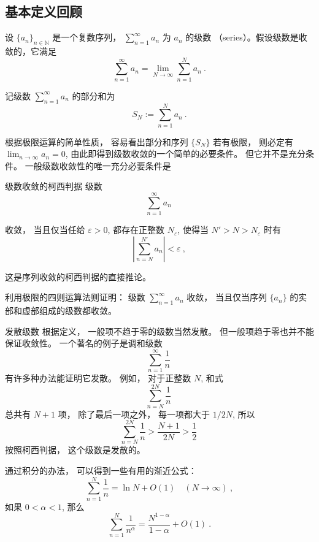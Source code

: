 

\subsection{基本定义回顾}


设 $\{a_n\}_{n\in\mathbb{N}}$ 是一个复数序列， $\sum_{n=1}^\infty a_n$ 为 $a_n$ 的级数 （series）。假设级数是收敛的，它满足
$$
\sum_{n=1}^\infty a_n = \lim_{N \to \infty} \sum_{n=1}^N a_n~.
$$

记级数 $\sum_{n=1}^\infty a_n$ 的部分和为
\[
S_N := \sum_{n=1}^N a_n~.
\]

根据极限运算的简单性质， 容易看出部分和序列 $\{S_N\}$ 若有极限， 则必定有 $\lim_{n\to\infty}a_n=0$, 由此即得到级数收敛的一个简单的必要条件。 但它并不是充分条件。 一般级数收敛性的唯一充分必要条件是
\begin{theorem}{级数收敛的柯西判据}
级数
\begin{equation}
\sum_{n=1}^\infty a_n~
\end{equation}



收敛， 当且仅当任给 $\varepsilon>0$, 都存在正整数 $N_\varepsilon$, 使得当 $N'>N>N_\varepsilon$ 时有
$$
\left|\sum_{n=N}^{N'} a_n\right|<\varepsilon~,
$$
\end{theorem}
这是序列收敛的柯西判据的直接推论。

\begin{exercise}{}
利用极限的四则运算法则证明： 级数 $\sum_{n=1}^\infty a_n$ 收敛， 当且仅当序列 $\{a_n\}$ 的实部和虚部组成的级数都收敛。
\end{exercise}

\begin{example}{发散级数}
根据定义， 一般项不趋于零的级数当然发散。 但一般项趋于零也并不能保证收敛性。 一个著名的例子是调和级数
$$
\sum_{n=1}^\infty\frac{1}{n}~
$$
有许多种办法能证明它发散。 例如， 对于正整数 $N$, 和式
$$
\sum_{n=N}^{2N}\frac{1}{n}~
$$
总共有 $N+1$ 项， 除了最后一项之外， 每一项都大于 $1/2N$, 所以
$$
\sum_{n=N}^{2N}\frac{1}{n}>\frac{N+1}{2N}>\frac{1}{2}~
$$
按照柯西判据， 这个级数是发散的。

通过积分的办法， 可以得到一些有用的渐近公式：
$$
\sum_{n=1}^{N}\frac{1}{n}=\ln N+O(1)\quad (N\to\infty)~,
$$
如果 $0<\alpha<1$, 那么
$$
\sum_{n=1}^{N}\frac{1}{n^\alpha}=\frac{N^{1-\alpha}}{1-\alpha}+O(1)~.
$$
\end{example}


